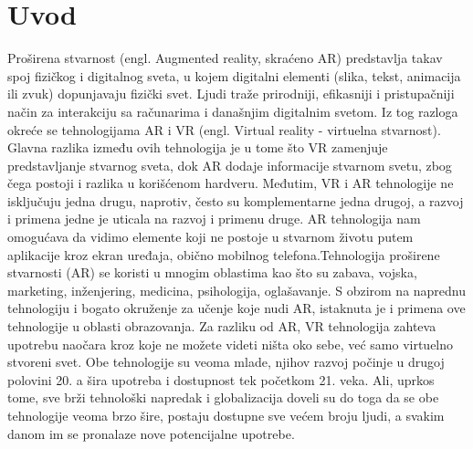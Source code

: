 \documentclass[a4paper]{article}
\begin{document}
	\section{Uvod}
	\label{sec:Uvod}
	Proširena stvarnost (engl. Augmented reality, skraćeno AR) predstavlja takav spoj fizičkog i digitalnog sveta, u kojem digitalni elementi (slika, tekst, animacija ili zvuk) dopunjavaju fizički svet. Ljudi traže prirodniji, efikasniji i pristupačniji način za interakciju sa računarima i današnjim digitalnim svetom. Iz tog razloga okreće se tehnologijama AR i VR (engl. Virtual reality - virtuelna stvarnost). Glavna razlika između ovih tehnologija je u tome što VR zamenjuje predstavljanje stvarnog sveta, dok AR dodaje informacije stvarnom svetu, zbog čega postoji i razlika u korišćenom hardveru. Međutim, VR i AR tehnologije ne isključuju jedna drugu, naprotiv, često su komplementarne jedna drugoj, a razvoj i primena jedne je uticala na razvoj i primenu druge. AR tehnologija nam omogućava da vidimo elemente koji ne postoje u stvarnom životu putem aplikacije kroz ekran uređaja, obično mobilnog telefona.Tehnologija proširene stvarnosti (AR) se koristi u mnogim oblastima kao što su zabava, vojska, marketing, inženjering, medicina, psihologija, oglašavanje. S obzirom na naprednu tehnologiju i bogato okruženje za učenje koje nudi AR, istaknuta je i primena ove tehnologije u oblasti obrazovanja. Za razliku od AR, VR tehnologija zahteva upotrebu naočara kroz koje ne možete videti ništa oko sebe, već samo virtuelno stvoreni svet. Obe tehnologije su veoma mlade, njihov razvoj počinje u drugoj polovini 20. a šira upotreba i dostupnost tek početkom 21. veka. Ali, uprkos tome, sve brži tehnološki napredak i globalizacija doveli su do toga da se obe tehnologije veoma brzo šire, postaju dostupne sve većem broju ljudi, a svakim danom im se pronalaze nove potencijalne upotrebe.
	
\end{document}
